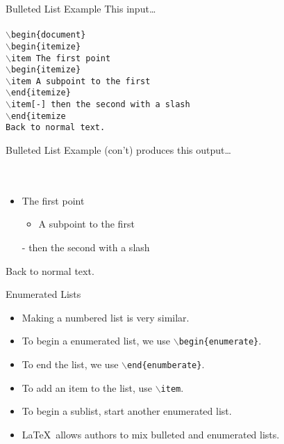\documentclass[pdf]{prosper}
\begin{document}
\begin{slide}{Bulleted List Example}
This input\ldots \\
\\
			\texttt{$\backslash$begin\{document\}} \\
			\texttt{$\backslash$begin\{itemize\}} \\
			\texttt{$\backslash$item The first point} \\
			\texttt{$\backslash$begin\{itemize\}} \\
			\texttt{$\backslash$item A subpoint to the first} \\
			\texttt{$\backslash$end\{itemize\}} \\
			\texttt{$\backslash$item[-] then the second with a slash} \\
			\texttt{$\backslash$end\{itemize} \\
			\texttt{Back to normal text.} \\
\end{slide}
\begin{slide}{Bulleted List Example (con't)}
produces this output\ldots \\
\\
\\
			\begin{itemize}
				\item The first point
					\begin{itemize}
						\item A subpoint to the first
					\end{itemize}
				\item[-] then the second with a slash
			\end{itemize}
			Back to normal text.
\end{slide}
\begin{slide}{Enumerated Lists}
	\begin{itemize}
		\item Making a numbered list is very similar.
		\item To begin a enumerated list, we use \texttt{$\backslash$begin\{enumerate\}}.
		\item To end the list, we use \texttt{$\backslash$end\{enumberate\}}.
		\item To add an item to the list, use \texttt{$\backslash$item}.
		\item To begin a sublist, start another enumerated list.
		\item \LaTeX\ allows authors to mix bulleted and enumerated lists.
	\end{itemize}
\end{slide}
\end{document}
